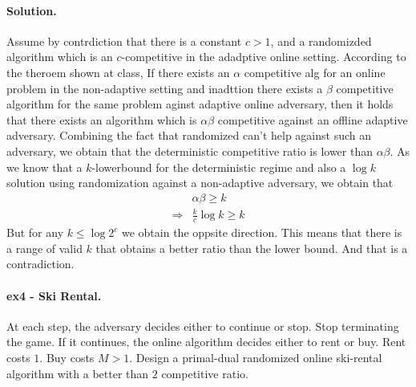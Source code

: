 \documentclass{article}
\begin{document}
\begin{multicols*}{2}
  \paragraph{Solution.} Assume by contrdiction that there is a constant $c> 1$, and a randomizded algorithm which is an $c$-competitive in the adadptive online setting. According to the theroem shown at class, If there exists an $\alpha$ competitive alg for an online problem in the non-adaptive setting and inadttion there exists a $\beta$ competitive algorithm for the same problem aginst adaptive online adversary, then it holds that there exists an algorithm which is $\alpha\beta$ competitive against an offline adaptive adversary. 
  Combining the fact that randomized can't help against such an adversary, we obtain that the deterministic competitive ratio is lower than $\alpha\beta$. As we know that a $k$-lowerbound for the deterministic regime and also a $\log k$ solution using randomization against a non-adaptive adversary, we obtain that      
  \begin{equation*}
    \begin{split}
      & \alpha\beta \ge k \\ 
      \Rightarrow  & \frac{k}{c}\log k \ge k 
    \end{split}
  \end{equation*} But for any $ k \le \log 2^{c} $ we obtain the oppsite direction. This means that there is a range of valid $k$ that obtains a better ratio than the lower bound. And that is a contradiction.   

  \paragraph{ex4 - Ski Rental.} At each step, the adversary decides either to continue or stop. Stop terminating the game. If it continues, the online algorithm decides either to rent or buy. Rent costs $1$. Buy costs $M > 1$. Design a primal-dual randomized online ski-rental algorithm with a better than $2$ competitive ratio.  

\end{multicols*}
\end{document}
